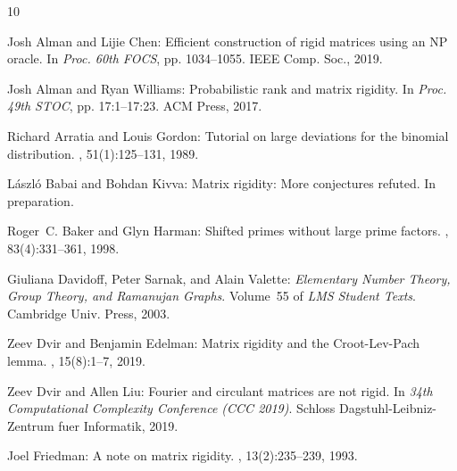 \documentclass[11pt]{article}
\numberwithin{equation}{section}
\theoremstyle{definition}
\theoremstyle{plain}
\theoremstyle{definition}
\begin{document}
\tocrefpdfbookmark
\begin{thebibliography}{10}

{\sc Josh Alman and Lijie Chen}: Efficient construction of rigid matrices using
  an {NP} oracle.
\newblock In {\em Proc. 60th FOCS}, pp. 1034--1055. IEEE Comp. Soc., 2019.

{\sc Josh Alman and Ryan Williams}: Probabilistic rank and matrix rigidity.
\newblock In {\em Proc. 49th STOC}, pp. 17:1--17:23. ACM Press, 2017.

{\sc Richard Arratia and Louis Gordon}: Tutorial on large deviations for the
  binomial distribution.
, 51(1):125--131, 1989.
\newblock [\epfmtdoi{10.1007/BF02458840}]

{\sc L\'aszl\'o Babai and Bohdan Kivva}: Matrix rigidity: {M}ore conjectures
  refuted.
\newblock In preparation.

{\sc Roger~C. Baker and Glyn Harman}: Shifted primes without large prime
  factors.
, 83(4):331--361, 1998.
\newblock [\epfmtdoi{10.4064/aa-83-4-331-361}]

{\sc Giuliana Davidoff, Peter Sarnak, and Alain Valette}: {\em Elementary
  Number Theory, Group Theory, and Ramanujan Graphs}.
\newblock Volume~55 of {\em LMS Student Texts}.
\newblock Cambridge Univ. Press, 2003.

{\sc Zeev Dvir and Benjamin Edelman}: Matrix rigidity and the {Croot-Lev-Pach}
  lemma.
, 15(8):1--7, 2019.

{\sc Zeev Dvir and Allen Liu}: Fourier and circulant matrices are not rigid.
\newblock In {\em 34th Computational Complexity Conference (CCC 2019)}. Schloss
  Dagstuhl-Leibniz-Zentrum fuer Informatik, 2019.

{\sc Joel Friedman}: A note on matrix rigidity.
, 13(2):235--239, 1993.
\newblock [\epfmtdoi{10.1007/BF01303207}]


\end{thebibliography}
\end{document}
